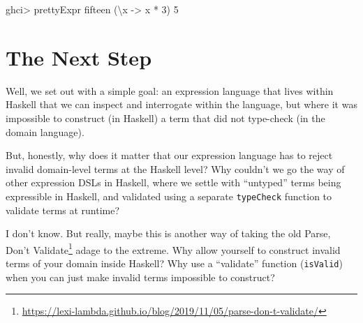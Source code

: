 \documentclass[]{article}
\newenvironment{Shaded}{}{}
\newcommand{\DataTypeTok}[1]{\textcolor[rgb]{0.56,0.13,0.00}{#1}}
\newcommand{\DecValTok}[1]{\textcolor[rgb]{0.25,0.63,0.44}{#1}}
\newcommand{\FunctionTok}[1]{\textcolor[rgb]{0.02,0.16,0.49}{#1}}
\newcommand{\KeywordTok}[1]{\textcolor[rgb]{0.00,0.44,0.13}{\textbf{#1}}}
\newcommand{\NormalTok}[1]{#1}
\newcommand{\OperatorTok}[1]{\textcolor[rgb]{0.40,0.40,0.40}{#1}}
\newcommand{\OtherTok}[1]{\textcolor[rgb]{0.00,0.44,0.13}{#1}}
\newcommand{\StringTok}[1]{\textcolor[rgb]{0.25,0.44,0.63}{#1}}
\renewcommand{\href}[2]{#2\footnote{\url{#1}}}
\begin{document}
\begin{Shaded}
\end{Shaded}

\begin{Shaded}
\begin{Highlighting}[]
\NormalTok{ghci}\OperatorTok{\textgreater{}}\NormalTok{ prettyExpr fifteen}
\NormalTok{(\textbackslash{}x }\OtherTok{{-}\textgreater{}}\NormalTok{ x }\OperatorTok{*} \DecValTok{3}\NormalTok{) }\DecValTok{5}
\end{Highlighting}
\end{Shaded}

\section{The Next Step}\label{the-next-step}

Well, we set out with a simple goal: an expression language that lives within
Haskell that we can inspect and interrogate within the language, but where it
was impossible to construct (in Haskell) a term that did not type-check (in the
domain language).

But, honestly, why does it matter that our expression language has to reject
invalid domain-level terms at the Haskell level? Why couldn't we go the way of
other expression DSLs in Haskell, where we settle with ``untyped'' terms being
expressible in Haskell, and validated using a separate \texttt{typeCheck}
function to validate terms at runtime?

I don't know. But really, maybe this is another way of taking the old
\href{https://lexi-lambda.github.io/blog/2019/11/05/parse-don-t-validate/}{Parse,
Don't Validate} adage to the extreme. Why allow yourself to construct invalid
terms of your domain inside Haskell? Why use a ``validate'' function
(\texttt{isValid}) when you can just make invalid terms impossible to construct?
\end{document}
